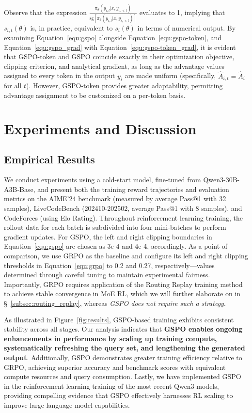 Observe that the expression $\frac{ \pi_{\theta} (y_{i,t} | x, y_{i,<t}) }{ \mathrm{sg} \left[ \pi_{\theta} (y_{i,t} | x, y_{i,<t}) \right] }$ evaluates to 1, implying that $s_{i,t}(\theta)$ is, in practice, equivalent to $s_{i}(\theta)$ in terms of numerical output. By examining Equation~\eqref{equ:gspo} alongside Equation~\eqref{equ:gspo-token}, and Equation~\eqref{equ:gspo_grad} with Equation~\eqref{equ:gspo-token_grad}, it is evident that GSPO-token and GSPO coincide exactly in their optimization objective, clipping criterion, and analytical gradient, as long as the advantage values assigned to every token in the output $y_i$ are made uniform (specifically, $\widehat{A}_{i,t} = \widehat{A}_{i}$ for all $t$). However, GSPO-token provides greater adaptability, permitting advantage assignment to be customized on a per-token basis.

\section{Experiments and Discussion}

\subsection{Empirical Results}

We conduct experiments using a cold-start model, fine-tuned from Qwen3-30B-A3B-Base, and present both the training reward trajectories and evaluation metrics on the AIME'24 benchmark (measured by average Pass@1 with 32 samples), LiveCodeBench (202410-202502, average Pass@1 with 8 samples), and CodeForces (using Elo Rating). Throughout reinforcement learning training, the rollout data for each batch is subdivided into four mini-batches to perform gradient updates. For GSPO, the left and right clipping boundaries in Equation~\eqref{equ:gspo} are chosen as 3e-4 and 4e-4, accordingly. As a point of comparison, we use GRPO as the baseline and configure its left and right clipping thresholds in Equation~\eqref{equ:grpo} to 0.2 and 0.27, respectively—values determined through careful tuning to maintain experimental fairness. Importantly, GRPO requires application of the Routing Replay training method to achieve stable convergence in MoE RL, which we will further elaborate on in \S~\ref{subsec:routing_replay}, whereas \textit{GSPO does not require such a strategy}.

As illustrated in Figure~\ref{fig:results}, GSPO-based training exhibits consistent stability across all stages. Our analysis indicates that \textbf{GSPO enables ongoing enhancements in performance by scaling up training compute, systematically refreshing the query set, and lengthening the generated output}. Additionally, GSPO demonstrates greater training efficiency relative to GRPO, achieving superior accuracy and benchmark scores with equivalent compute resources and query consumption. Lastly, we have implemented GSPO in the reinforcement learning training of the most recent Qwen3 models, providing compelling evidence that GSPO effectively harnesses RL scaling to improve large language model capabilities.

